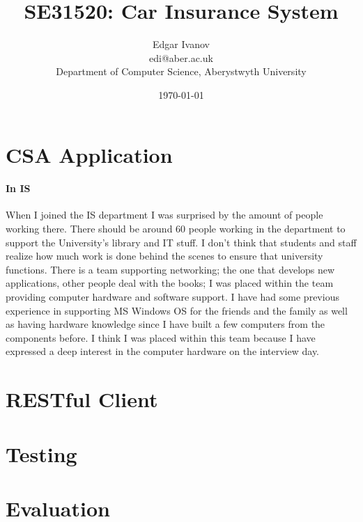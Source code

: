 \documentclass[10pt,a4paper,headinclude=true,twoside]{report}
\begin{document}
\title{SE31520: Car Insurance System}
\author{Edgar Ivanov\\ edi@aber.ac.uk \\ Department of Computer Science, Aberystwyth University}
\date{\today}
\maketitle

\newpage
\thispagestyle{empty}
\mbox{}

\tableofcontents

\chapter{CSA Application}
\subsubsection{In IS}
When I joined the IS department I was surprised by the amount of people working there. There should be around 60 people working in the department to support the University's library and IT stuff. I don't think that students and staff realize how much work is done behind the scenes to ensure that university functions. There is a team supporting networking; the one that develops new applications, other people deal with the books; I was placed within the team providing computer hardware and software support. I have had some previous experience in supporting MS Windows OS for the friends and the family as well as having hardware knowledge since I have built a few computers from the components before. I think I was placed within this team because I have expressed a deep interest in the computer hardware on the interview day.

\chapter{RESTful Client}
\chapter{Testing}
\chapter{Evaluation}



\end{document}
